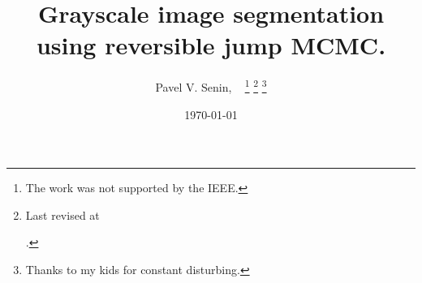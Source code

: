 \documentclass[journal]{IEEEtran}
\begin{document}
%
\title{Grayscale image segmentation using reversible jump MCMC.}
%
%
\author{Pavel V. Senin,
			  ~%
\thanks{The work was not supported by the IEEE.}%
\thanks{Last revised at \date{\today}.}%
\thanks{Thanks to my kids for constant disturbing.}}
% 
%
%
% 


\end{document}
